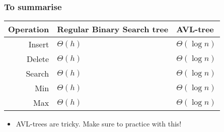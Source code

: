 \begin{frame}
	\frametitle{To summarise}

	\begin{tabular}{r | l l}
		Operation & Regular Binary Search tree & AVL-tree \\
		\midrule
		Insert & $\Theta(h)$ & $\Theta(\log n)$ \\
		Delete & $\Theta(h)$ & $\Theta(\log n)$ \\
		Search & $\Theta(h)$ & $\Theta(\log n)$ \\
		Min & $\Theta(h)$    & $\Theta(\log n)$ \\
		Max & $\Theta(h)$    & $\Theta(\log n)$ \\
	\end{tabular}
	\begin{itemize}
		\item AVL-trees are tricky. Make sure to practice with this!
	\end{itemize}
\end{frame}
